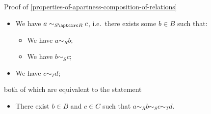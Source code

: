 \begin{Proof}{Proof of \cref{properties-of-apartness-composition-of-relations}}
\begin{itemize}
\begin{itemize}
                \item We have $a\sim_{S\aptcirc R}c$, i.e.\ there exists some $b\in B$ such that:
                    \begin{itemize}
                        \item We have $a\sim_{R}b$;
                        \item We have $b\sim_{S}c$;
                    \end{itemize}
                \item We have $c\sim_{T}d$;
            \end{itemize}
    \end{itemize}
    both of which are equivalent to the statement
    \begin{itemize}
        \item There exist $b\in B$ and $c\in C$ such that $a\sim_{R}b\sim_{S}c\sim_{T}d$.
    \end{itemize}


\end{Proof}

